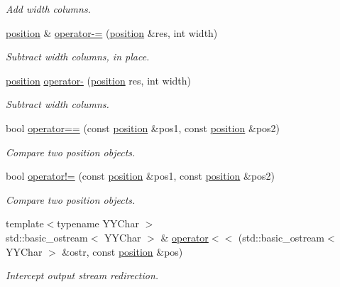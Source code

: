 \begin{DoxyCompactItemize}
\begin{DoxyCompactList}\small\item\em Add {\itshape width} columns. \end{DoxyCompactList}\item 
\hyperlink{classyy_1_1position}{position} \& \hyperlink{namespaceyy_a4cad44f80947f872e1bbf32fec9b7973}{operator-\/=} (\hyperlink{classyy_1_1position}{position} \&res, int width)
\begin{DoxyCompactList}\small\item\em Subtract {\itshape width} columns, in place. \end{DoxyCompactList}\item 
\hyperlink{classyy_1_1position}{position} \hyperlink{namespaceyy_af6d37eb09001871194885eb8d31fef92}{operator-\/} (\hyperlink{classyy_1_1position}{position} res, int width)
\begin{DoxyCompactList}\small\item\em Subtract {\itshape width} columns. \end{DoxyCompactList}\item 
bool \hyperlink{namespaceyy_a30a61b0569cd2c9ea4ae16eb4994c7b3}{operator==} (const \hyperlink{classyy_1_1position}{position} \&pos1, const \hyperlink{classyy_1_1position}{position} \&pos2)
\begin{DoxyCompactList}\small\item\em Compare two position objects. \end{DoxyCompactList}\item 
bool \hyperlink{namespaceyy_abf91f5a379cf9f8c8be94f650c48c06c}{operator!=} (const \hyperlink{classyy_1_1position}{position} \&pos1, const \hyperlink{classyy_1_1position}{position} \&pos2)
\begin{DoxyCompactList}\small\item\em Compare two position objects. \end{DoxyCompactList}\item 
{\footnotesize template$<$typename Y\-Y\-Char $>$ }\\std\-::basic\-\_\-ostream$<$ Y\-Y\-Char $>$ \& \hyperlink{namespaceyy_ac0f65a84b37cc3e7731a310eb240b952}{operator$<$$<$} (std\-::basic\-\_\-ostream$<$ Y\-Y\-Char $>$ \&ostr, const \hyperlink{classyy_1_1position}{position} \&pos)
\begin{DoxyCompactList}\small\item\em Intercept output stream redirection. \end{DoxyCompactList}\end{DoxyCompactItemize}


